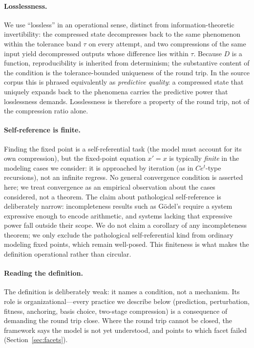\documentclass[11pt]{article}
\newcommand{\Dmap}{D}
\begin{document}
\paragraph{Losslessness.}
We use ``lossless'' in an operational sense, distinct from
information-theoretic invertibility: the compressed state decompresses back to
the same phenomenon within the tolerance band $\tau$ on every attempt, and two
compressions of the same input yield decompressed outputs whose difference lies
within $\tau$. Because $\Dmap$ is a function, reproducibility is inherited from
determinism; the substantive content of the condition is the
tolerance-bounded uniqueness of the round trip. In the source corpus this is
phrased equivalently as \emph{predictive quality}: a compressed state that
uniquely expands back to the phenomena carries the predictive power that
losslessness demands. Losslessness is therefore a property of the round trip,
not of the compression ratio alone.

\paragraph{Self-reference is finite.}
Finding the fixed point is a self-referential task (the model must account for
its own compression), but the fixed-point equation $x' = x$ is typically
\emph{finite} in the modeling cases we consider: it is approached by iteration
(as in $Ce^{t}$-type recursions), not an infinite regress. No general
convergence condition is asserted here; we treat convergence as an empirical
observation about the cases considered, not a theorem. The claim about
pathological self-reference is deliberately narrow: incompleteness results such
as G\"odel's require a system expressive enough to encode arithmetic, and
systems lacking that expressive power fall outside their scope. We do not claim
a corollary of any incompleteness theorem; we only exclude the pathological
self-referential kind from ordinary modeling fixed points, which remain
well-posed. This finiteness is what makes the definition operational rather
than circular.

\paragraph{Reading the definition.}
The definition is deliberately weak: it names a condition, not a mechanism. Its
role is organizational---every practice we describe below (prediction,
perturbation, fitness, anchoring, basis choice, two-stage compression) is a
consequence of demanding the round trip close. Where the round trip cannot be
closed, the framework says the model is not yet understood, and points to which
facet failed (Section~\ref{sec:facets}).
\end{document}
